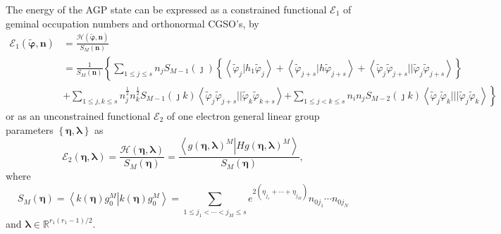 \documentclass[aps,preprint]{revtex4}%
\begin{document}
The energy of the AGP state can be expressed as a constrained functional
$\mathcal{E}_{1}$ of geminal occupation numbers and orthonormal CGSO's, by
\emph{ }
\begin{align}
\mathcal{E}_{1}\left(  \boldsymbol{\tilde{\varphi},n}\right)   &
=\frac{\mathcal{H}\left(  \boldsymbol{\tilde{\varphi},n}\right)  }%
{S_{M}\left(  \boldsymbol{n}\right)  }\nonumber\\
&  =\frac{1}{S_{M}\left(  \boldsymbol{n}\right)  }\left\{  \sum_{1\leq j\leq
s}n_{j}S_{M-1}\left(  \jmath\right)  \left\{  \left\langle \tilde{\varphi}%
_{j}\left\vert h_{1}\right.  \tilde{\varphi}_{j}\right\rangle +\left\langle
\tilde{\varphi}_{j+s}\left\vert h\right.  \tilde{\varphi}_{j+s}\right\rangle
+\left\langle \tilde{\varphi}_{j}\tilde{\varphi}_{j+s}||\tilde{\varphi}%
_{j}\tilde{\varphi}_{j+s}\right\rangle \right\}  \right.  \nonumber\\
&  +\sum_{1\leq j,k\leq s}n_{j}^{\frac{1}{2}}n_{k}^{\frac{1}{2}}S_{M-1}\left(
\jmath k\right)  \left\langle \tilde{\varphi}_{j}\tilde{\varphi}_{j+s}%
||\tilde{\varphi}_{k}\tilde{\varphi}_{k+s}\right\rangle \left.  +\sum_{1\leq
j<k\leq s}n_{i}n_{j}S_{M-2}\left(  \jmath k\right)  \left\langle
\tilde{\varphi}_{j}\tilde{\varphi}_{k}|||\tilde{\varphi}_{j}\tilde{\varphi
}_{k}\right\rangle \right\}  \label{energy}%
\end{align}
or as an unconstrained functional $\mathcal{E}_{2}$ of one electron general
linear group parameters $\left\{  \boldsymbol{\eta},\boldsymbol{\lambda
}\right\}  $ as
\begin{equation}
\mathcal{E}_{2}\left(  \boldsymbol{\eta},\boldsymbol{\lambda}\right)
=\frac{\mathcal{H}\left(  \boldsymbol{\eta},\boldsymbol{\lambda}\right)
}{S_{M}\left(  \boldsymbol{\eta}\right)  }=\frac{\left\langle \left.  g\left(
\boldsymbol{\eta},\boldsymbol{\lambda}\right)  ^{M}\right\vert Hg\left(
\boldsymbol{\eta},\boldsymbol{\lambda}\right)  ^{M}\right\rangle }%
{S_{M}\left(  \boldsymbol{\eta}\right)  },\label{gp_funct}%
\end{equation}
where%
\begin{equation}
S_{M}\left(  \boldsymbol{\eta}\right)  =\left\langle \left.  k\left(
\boldsymbol{\eta}\right)  g_{0}^{M}\right\vert k\left(  \boldsymbol{\eta
}\right)  g_{0}^{M}\right\rangle =\sum_{1\leq j_{1}<\cdots<j_{M}\leq
s}e^{2\left(  \eta_{j_{1}}+\cdots+\eta_{j_{M}}\right)  }n_{0j_{1}}\cdots
n_{0j_{N}}%
\end{equation}
and $\boldsymbol{\lambda\in}\mathbb{R}^{r_{1}\left(  r_{1}-1\right)  /2}.$
\end{document}
